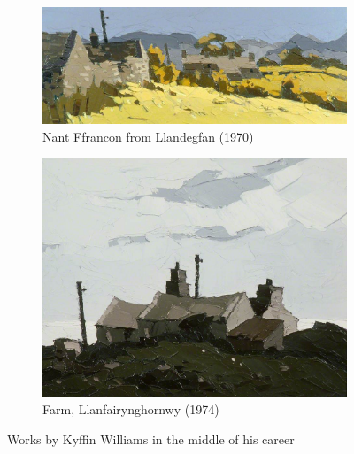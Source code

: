 \documentclass[11pt,fleqn,twoside]{article}
\begin{document}
\begin{figure}[h]
\centering
\begin{subfigure}[b]{0.4\textwidth}
  \centering
  \includegraphics[width=\textwidth]{img/gac_gac_13839_large.jpg}
  \caption{Nant Ffrancon from Llandegfan (1970)}
\end{subfigure}
\begin{subfigure}[b]{0.4\textwidth}
  \centering
  \includegraphics[width=\textwidth]{img/nlw_nlw_gcf02283_large.jpg}
  \caption{Farm, Llanfairynghornwy (1974)}
\end{subfigure}
\caption{Works by Kyffin Williams in the middle of his career}
\label{fig:kyffin-mid}
\end{figure}
\end{document}
